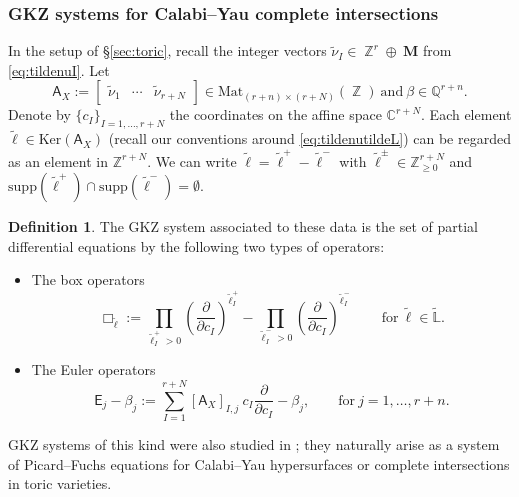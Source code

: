 \documentclass[12pt,a4paper,oneside]{amsart}
\numberwithin{equation}{section}
\theoremstyle{definition}
\newtheorem{defin}[thm]{Definition}
\theoremstyle{remark}
\DeclareMathOperator{\Z}{\mathbb{Z}}
\newcommand{\Eop}{\mathsf{E}}
\begin{document}
\subsubsection{GKZ systems for Calabi--Yau complete intersections}
\label{sec:GKZCICY}
In the setup of \S\ref{sec:toric}, recall the integer vectors $\tilde{\nu}_I \in \Z^{r} \oplus~\mathbf{M}$ from \eqref{eq:tildenuI}. Let
\begin{equation}
\label{eq:gkz-ci}
    \mathsf{A}_X:=
    \begin{bmatrix}
        \tilde{\nu}_{1} & \cdots & \tilde{\nu}_{r+N}
    \end{bmatrix}\in \mathrm{Mat}_{(r+n) \times (r+N) } (\Z )~\mbox{and}~\beta \in \mathbb{Q}^{r+n}.
\end{equation}
Denote by \( \{ c_{I} \}_{I=1,\ldots,r+N}\)
the coordinates on the affine space \(\mathbb{C}^{r+N}\).
Each element \(\tilde{\ell}\in\mathrm{Ker}(\mathsf{A}_X)\)
(recall our conventions around \eqref{eq:tildenutildeL})
can be regarded as an element in \(\mathbb{Z}^{r+N}\).
We can write \(\tilde{\ell}=\tilde{\ell}^{+}-\tilde{\ell}^{-}\) with 
\(\tilde{\ell}^{\pm}\in\mathbb{Z}^{r+N}_{\ge 0}\)
and \(\mathrm{supp}(\tilde{\ell}^{+})\cap \mathrm{supp}(\tilde{\ell}^{-})=\emptyset\).
\begin{defin}The GKZ system associated to these data is the set of partial differential equations by the following two types of operators:
\begin{itemize}
	\item The box operators 
	\begin{equation}
	\label{eq:GKZCICYBox}
	\Box_{\tilde{\ell}} := \prod_{\tilde{\ell}_{I}^{+}>0}\left(\frac{\partial}{\partial c_{I}}\right)^{ \tilde{\ell}_{I}^{+}} - \prod_{\tilde{\ell}_{I}^{-}>0}\left(\frac{\partial}{\partial c_{I}}\right)^{ \tilde{\ell}_{I}^{-}}~\qquad \mbox{for}~\tilde{\ell}\in\widetilde{\mathbb{L}}.
	\end{equation}
	\item The Euler operators
	\begin{equation}
	\label{eq:GKZCICYEuler}
	\Eop_j - \beta_j  := \sum_{I=1}^{r+N} [ \mathsf{A}_X]_{I,j} ~ c_{I}\frac{\partial}{\partial c_{I}} - \beta_j  , \qquad \mbox{for}~j=1, \dots, r+n .
	\end{equation}
\end{itemize}
\end{defin}
GKZ systems of this kind were also studied in \cite{Batyrev:1993V,Hosono:1995bm};
they naturally arise as a system of 
Picard--Fuchs equations for Calabi--Yau hypersurfaces or complete intersections in 
toric varieties.
\end{document}
